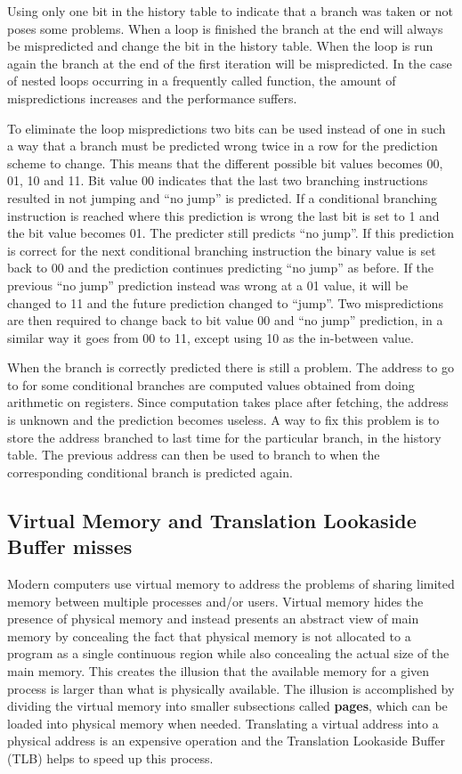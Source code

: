 Using only one bit in the history table to indicate that a branch was taken or not poses some problems.
When a loop is finished the branch at the end will always be mispredicted and change the bit in the history table.
When the loop is run again the branch at the end of the first iteration will be mispredicted.
In the case of nested loops occurring in a frequently called function, the amount of mispredictions increases and the performance suffers.

To eliminate the loop mispredictions two bits can be used instead of one in such a way that a branch must be predicted wrong twice in a row for the prediction scheme to change.
This means that the different possible bit values becomes
00, 01, 10 and 11.
Bit value 00 indicates that the last two branching instructions resulted in not jumping and “no jump” is predicted. If a conditional branching instruction is reached where this prediction is wrong the last bit is set to 1 and the bit value becomes 01. The predicter still predicts “no jump”.
If this prediction is correct for the next conditional branching instruction the binary value is set back to 00 and the prediction continues predicting “no jump” as before.
If the previous “no jump” prediction instead was wrong at a 01 value, it will be changed to 11 and the future prediction changed to “jump”.
Two mispredictions are then required to change back to bit value 00 and “no jump” prediction, in a similar way it goes from 00 to 11, except using 10 as the in-between value.

When the branch is correctly predicted there is still a problem.
The address to go to for some conditional branches are computed values obtained from doing arithmetic on registers. 
Since computation takes place after fetching, the address is unknown and the prediction becomes useless. 
A way to fix this problem is to store the address branched to last time for the particular branch, in the history table.
The previous address can then be used to branch to when the corresponding conditional branch is predicted again.


\subsection{Virtual Memory and Translation Lookaside Buffer misses}
Modern computers use virtual memory to address the problems of sharing limited memory between multiple processes and/or users.
Virtual memory hides the presence of physical memory and instead presents an abstract view of main memory by concealing the fact that physical memory is not allocated to a program as a single continuous region while also concealing the actual size of the main memory.
This creates the illusion that the available memory for a given process is larger than what is physically available.
The illusion is accomplished by dividing the virtual memory into smaller subsections called \textbf{pages}, which can be loaded into physical memory when needed.
Translating a virtual address into a physical address is an expensive operation and the Translation Lookaside Buffer (TLB) helps to speed up this process.

